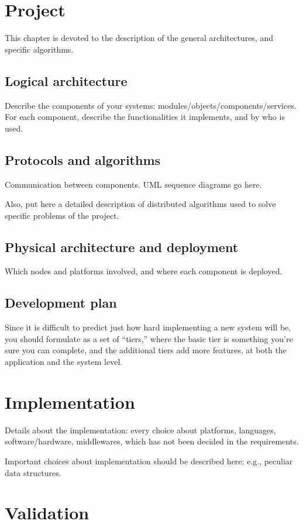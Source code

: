 \documentclass[a4paper, oneside]{memoir}
\begin{document}
\chapter{Project}

This chapter is devoted to the description of the general architectures, and specific algorithms.

\section{Logical architecture}
Describe the components of your systems: modules/objects/components/services.
For each component, describe the functionalities it implements, and by who is used.

\section{Protocols and algorithms}
Communication between components.  UML sequence diagrams go here.

Also, put here a detailed description of distributed algorithms used to solve specific problems of the project.

\section{Physical architecture and deployment}
Which nodes and platforms involved, and where each component is deployed.

\section{Development plan}
Since it is difficult to predict just how hard implementing a new system will be, you should formulate as a set of ``tiers,'' where the basic tier is something you’re sure you can complete, and the additional tiers add more features, at both the application and the system level.

\chapter{Implementation}

Details about the implementation: every choice about platforms, languages, software/hardware, middlewares, which has not been decided in the requirements.


Important choices about implementation should be described here; e.g., peculiar data structures.


\chapter{Validation}
\end{document}
